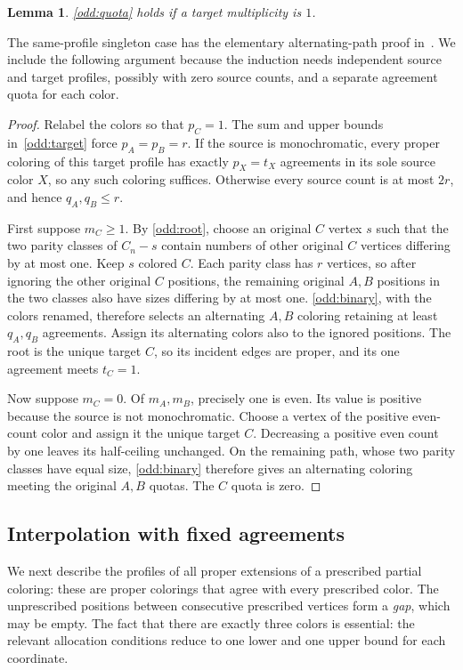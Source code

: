 \documentclass[11pt,reqno]{amsart}
\numberwithin{equation}{section}
\newtheorem{lemma}[theorem]{Lemma}
\theoremstyle{definition}
\theoremstyle{remark}
\begin{document}
\begin{lemma}\label{odd:singleton}
\cref{odd:quota} holds if a target multiplicity is $1$.
\end{lemma}
The same-profile singleton case has the elementary alternating-path
proof in~\cite[Theorem~7]{raleigh2018}. We include the following argument
because the induction needs independent source and target profiles,
possibly with zero source counts, and a separate agreement quota for
each color.
\begin{proof}
Relabel the colors so that $p_C=1$. The sum and upper bounds
in~\eqref{odd:target} force $p_A=p_B=r$. If the source is
monochromatic, every proper coloring of this target profile has
exactly $p_X=t_X$ agreements in its sole source color $X$, so any
such coloring suffices. Otherwise every source count is at most
$2r$, and hence $q_A,q_B\le r$.

First suppose $m_C\ge1$. By \cref{odd:root}, choose an original
$C$ vertex $s$ such that the two parity classes of $C_n-s$ contain
numbers of other original $C$ vertices differing by at most one.
Keep $s$ colored $C$. Each parity class has $r$ vertices, so after
ignoring the other original $C$ positions, the remaining original
$A,B$ positions in the two classes also have sizes differing by at
most one. \cref{odd:binary}, with the colors renamed, therefore
selects an alternating $A,B$ coloring retaining at least $q_A,q_B$
agreements. Assign its alternating colors also to the ignored
positions. The root is the unique target $C$, so its incident edges
are proper, and its one agreement meets $t_C=1$.

Now suppose $m_C=0$. Of $m_A,m_B$, precisely one is even. Its value
is positive because the source is not monochromatic.
Choose a vertex of the positive even-count
color and assign it the unique target $C$. Decreasing a positive even
count by one leaves its half-ceiling unchanged. On the remaining path,
whose two parity classes have equal size, \cref{odd:binary} therefore
gives an alternating coloring
meeting the original $A,B$ quotas. The $C$ quota is zero.
\end{proof}

\subsection{Interpolation with fixed agreements}

We next describe the profiles of all proper extensions of a prescribed
partial coloring: these are proper colorings that agree with every
prescribed color. The unprescribed positions between consecutive
prescribed vertices form a \emph{gap}, which may be empty.
The fact that there are exactly three colors is
essential: the relevant allocation conditions reduce to one lower and
one upper bound for each coordinate.
\end{document}
